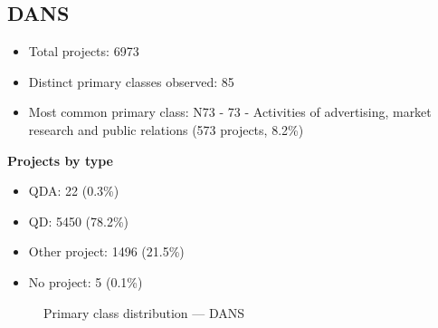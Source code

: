\subsection{DANS}

\begin{itemize}
    \item Total projects: 6973
    \item Distinct primary classes observed: 85
    \item Most common primary class: N73 - 73 - Activities of advertising, market research and public relations (573 projects, 8.2\%)
\end{itemize}
\textbf{Projects by type}
\begin{itemize}
    \item QDA: 22 (0.3\%)
    \item QD: 5450 (78.2\%)
    \item Other project: 1496 (21.5\%)
    \item No project: 5 (0.1\%)
\end{itemize}

\begin{figure}[h]
    \centering
    
    \caption{Primary class distribution --- DANS}
\end{figure}


